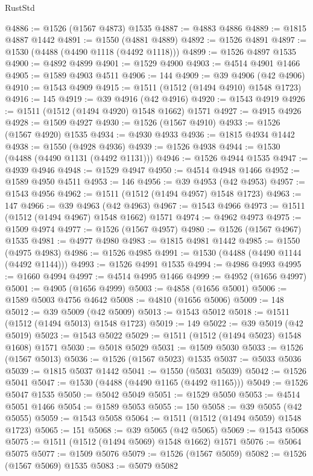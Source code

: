 \begin{lexlean}{RustStd}
\begin{coremodule}
{{@4886 := @1526 (@1567 @4873) @1535
@4887 := @4883 @4886
@4889 := @1815 @4887 @1442
@4891 := @1550 (@4881 @4889)
@4892 := @1526 @4891
@4897 := @1530 (@4488 (@4490 @1118 (@4492 @1118)))
@4899 := @1526 @4897 @1535
@4900 := @4892 @4899
@4901 := @1529 @4900
@4903 := @4514 @4901 @1466
@4905 := @1589 @4903 @4511
@4906 := 144
@4909 := @39 @4906 (@42 @4906)
@4910 := @1543 @4909
@4915 := @1511 (@1512 (@1494 @4910) @1548 @1723)
@4916 := 145
@4919 := @39 @4916 (@42 @4916)
@4920 := @1543 @4919
@4926 := @1511 (@1512 (@1494 @4920) @1548 @1662) @1571
@4927 := @4915 @4926
@4928 := @1509 @4927
@4930 := @1526 (@1567 @4910)
@4933 := @1526 (@1567 @4920) @1535
@4934 := @4930 @4933
@4936 := @1815 @4934 @1442
@4938 := @1550 (@4928 @4936)
@4939 := @1526 @4938
@4944 := @1530 (@4488 (@4490 @1131 (@4492 @1131)))
@4946 := @1526 @4944 @1535
@4947 := @4939 @4946
@4948 := @1529 @4947
@4950 := @4514 @4948 @1466
@4952 := @1589 @4950 @4511
@4953 := 146
@4956 := @39 @4953 (@42 @4953)
@4957 := @1543 @4956
@4962 := @1511 (@1512 (@1494 @4957) @1548 @1723)
@4963 := 147
@4966 := @39 @4963 (@42 @4963)
@4967 := @1543 @4966
@4973 := @1511 (@1512 (@1494 @4967) @1548 @1662) @1571
@4974 := @4962 @4973
@4975 := @1509 @4974
@4977 := @1526 (@1567 @4957)
@4980 := @1526 (@1567 @4967) @1535
@4981 := @4977 @4980
@4983 := @1815 @4981 @1442
@4985 := @1550 (@4975 @4983)
@4986 := @1526 @4985
@4991 := @1530 (@4488 (@4490 @1144 (@4492 @1144)))
@4993 := @1526 @4991 @1535
@4994 := @4986 @4993
@4995 := @1660 @4994
@4997 := @4514 @4995 @1466
@4999 := @4952 (@1656 @4997)
@5001 := @4905 (@1656 @4999)
@5003 := @4858 (@1656 @5001)
@5006 := @1589 @5003 @4756 @4642
@5008 := @4810 (@1656 @5006)
@5009 := 148
@5012 := @39 @5009 (@42 @5009)
@5013 := @1543 @5012
@5018 := @1511 (@1512 (@1494 @5013) @1548 @1723)
@5019 := 149
@5022 := @39 @5019 (@42 @5019)
@5023 := @1543 @5022
@5029 := @1511 (@1512 (@1494 @5023) @1548 @1608) @1571
@5030 := @5018 @5029
@5031 := @1509 @5030
@5033 := @1526 (@1567 @5013)
@5036 := @1526 (@1567 @5023) @1535
@5037 := @5033 @5036
@5039 := @1815 @5037 @1442
@5041 := @1550 (@5031 @5039)
@5042 := @1526 @5041
@5047 := @1530 (@4488 (@4490 @1165 (@4492 @1165)))
@5049 := @1526 @5047 @1535
@5050 := @5042 @5049
@5051 := @1529 @5050
@5053 := @4514 @5051 @1466
@5054 := @1589 @5053
@5055 := 150
@5058 := @39 @5055 (@42 @5055)
@5059 := @1543 @5058
@5064 := @1511 (@1512 (@1494 @5059) @1548 @1723)
@5065 := 151
@5068 := @39 @5065 (@42 @5065)
@5069 := @1543 @5068
@5075 := @1511 (@1512 (@1494 @5069) @1548 @1662) @1571
@5076 := @5064 @5075
@5077 := @1509 @5076
@5079 := @1526 (@1567 @5059)
@5082 := @1526 (@1567 @5069) @1535
@5083 := @5079 @5082
}}
\end{coremodule}
\end{lexlean}
